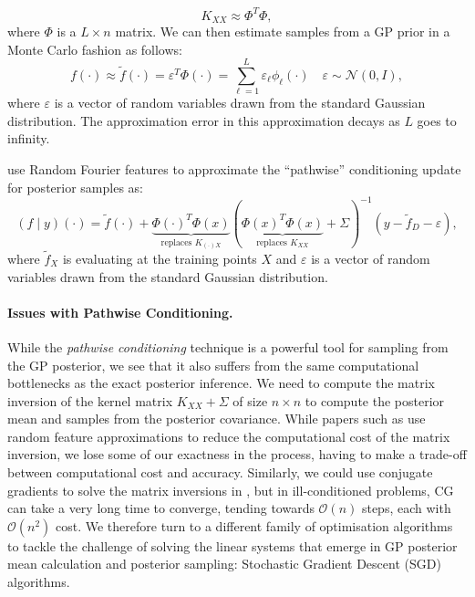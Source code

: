 \[
    K_{XX} \approx \Phi^T \Phi,
\]
where $\Phi$ is a $L \times n$ matrix. We can then estimate samples from a GP prior in a Monte Carlo fashion as follows:
\[
    f(\cdot) \approx \tilde{f}(\cdot)={\varepsilon}^T {\Phi}(\cdot)=\sum_{\ell=1}^L \varepsilon_{\ell} \phi_{\ell}(\cdot) \quad \varepsilon \sim \mathcal{N}(0, I), \label{eq:random_feature_approximation}
\]
where $\varepsilon$ is a vector of random variables drawn from the standard Gaussian distribution. The approximation error in this approximation decays as $L$ goes to infinity. 

\textcite{wilson2021pathwise} use Random Fourier features to approximate the ``pathwise'' conditioning update for posterior samples as:
\[
    (f \mid y)(\cdot) = \tilde{f}(\cdot) + \underbrace{{\Phi}(\cdot)^T {\Phi}({x})}_{\text {replaces } {K}_{(\cdot)X}} (\underbrace{{\Phi}({x})^T {\Phi}({x})}_{\text {replaces } {K}_{XX}}+{\Sigma})^{-1}(y-\tilde{f}_D-{\varepsilon}), \label{eq:random_feature_conditioning}
\]
where $\tilde{f}_X$ is evaluating  at the training points $X$ and $\varepsilon$ is a vector of random variables drawn from the standard Gaussian distribution.

\paragraph{Issues with Pathwise Conditioning.}

While the \emph{pathwise conditioning} technique is a powerful tool for sampling from the GP posterior, we see that it also suffers from the same computational bottlenecks as the exact posterior inference. We need to compute the matrix inversion of the kernel matrix $K_{XX} + \Sigma$ of size $n \times n$ to compute the posterior mean and samples from the posterior covariance. While papers such as \textcite{wilson2021pathwise} use random feature approximations to reduce the computational cost of the matrix inversion, we lose some of our exactness in the process, having to make a trade-off between computational cost and accuracy. Similarly, we could use conjugate gradients to solve the matrix inversions in , but in ill-conditioned problems, CG can take a very long time to converge, tending towards $\mathcal{O}(n)$ steps, each with $\mathcal{O}(n^2)$ cost. We therefore turn to a different family of optimisation algorithms to tackle the challenge of solving the linear systems that emerge in GP posterior mean calculation and posterior sampling: Stochastic Gradient Descent (SGD) algorithms.

